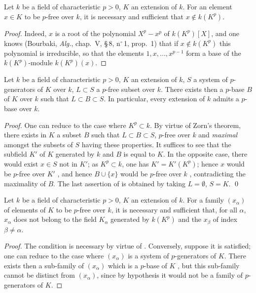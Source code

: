 \begin{lemma}[21.4.1]
\label{0.21.4.1}
Let $k$ be a field of characteristic $p>0$, $K$ an extension of $k$.
For an element $x\in K$ to be $p$-free over $k$, it is necessary and sufficient that $x\notin k(K^p)$.
\end{lemma}

\begin{proof}
Indeed, $x$ is a root of the polynomial $X^p-x^p$ of $k(K^p)[X]$, and one knows (Bourbaki, \emph{Alg.}, chap.~V, \S\,8, n$^\circ$\,1, prop.~1) that if $x\notin k(K^p)$ this polynomial is irreducible, so that the elements $1,x,\ldots,x^{p-1}$ form a base of the $k(K^p)$-module $k(K^p)(x)$.
\end{proof}

\begin{theorem}[21.4.2]
\label{0.21.4.2}
Let $k$ be a field of characteristic $p>0$, $K$ an extension of $k$, $S$ a system of $p$-generators of $K$ over $k$, $L\subset S$ a $p$-free subset over $k$.
There exists then a $p$-base $B$ of $K$ over $k$ such that $L\subset B\subset S$.
In particular, every extension of $k$ admits a $p$-base over $k$.
\end{theorem}

\begin{proof}
One can reduce to the case where $K^p\subset k$.
By virtue of Zorn's theorem, there exists in $K$ a subset $B$ such that $L\subset B\subset S$, $p$-free over $k$ and \emph{maximal} amongst the subsets of $S$ having these properties.
It suffices to see that the subfield $K'$ of $K$ generated by $k$ and $B$ is equal to $K$.
In the opposite case, there would exist $x\in S$ not in $K'$; as $K^p\subset k$, one has $K'=K'(K^p)$; hence $x$ would be $p$-free over $K'$ , and hence $B\cup\{x\}$ would be $p$-free over $k$ , contradicting the maximality of $B$.
The last assertion of  is obtained by taking $L=\emptyset$, $S=K$.
\qed
\end{proof}

\begin{corollary}[21.4.3]
\label{0.21.4.3}
Let $k$ be a field of characteristic $p>0$, $K$ an extension of $k$.
For a family $(x_\alpha)$ of elements of $K$ to be $p$-free over $k$, it is necessary and sufficient that, for all $\alpha$, $x_\alpha$ does not belong to the field $K_\alpha$ generated by $k(K^p)$ and the $x_\beta$ of index $\beta\neq\alpha$.
\end{corollary}

\begin{proof}
The condition is necessary by virtue of .
Conversely, suppose it is satisfied; one can reduce to the case where $(x_\alpha)$ is a system of $p$-generators of $K$.
There exists then a sub-family of $(x_\alpha)$ which is a $p$-base of $K$ , but this sub-family cannot be distinct from $(x_\alpha)$, since by hypothesis it would not be a family of $p$-generators of $K$.
\end{proof}

